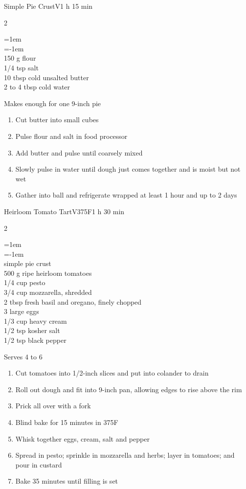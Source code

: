 \documentclass{article}
\newenvironment{recipe}[3][]
    {\begin{cardbase}[#1]{#2}{#3}
    \columnratio{0.333}
    \begin{paracol}{2}}
    {\end{paracol}\end{cardbase}}
\newenvironment{denserecipe}[3][]
    {\small
    \begin{recipe}[#1]{#2}{#3}}
    {\end{recipe}}
\newcommand{\nextcolumn}{\switchcolumn}
\newenvironment{ingredients}
    {
    \begin{obeylines}
    \vspace{\parskip}
    \setlength{\parskip}{0.25em}
    \vspace{-0.25em}
    \leftskip=1em
    \parindent=-1em}
    {\end{obeylines}}
\newenvironment{steps}
    {\begin{enumerate}[leftmargin=*,topsep=0pt]}
    {\end{enumerate}}
\newcommand{\fahrenheit}[1]{#1\textdegree{}F}
\newcommand{\tag}[1]{\hspace{1em}#1}
\newcommand{\symboltag}[2]{\tag{#1\hspace{0.4em}#2}}
\newcommand{\totaltime}[1]{\symboltag{\raisebox{-0.1em}{\small\StopWatchEnd}}{#1}}
\newcommand{\preheat}[1]{\symboltag{\Topbottomheat}{#1}}
\begin{document}
\begin{recipe}{Simple Pie Crust}{\tag{V}\totaltime{1 h 15 min}}
\begin{ingredients}
150 g flour
1/4 tsp salt
10 tbsp cold unsalted butter
2 to 4 tbsp cold water
\end{ingredients}
\nextcolumn
Makes enough for one 9-inch pie
\begin{steps}
    \item Cut butter into small cubes
    \item Pulse flour and salt in food processor
    \item Add butter and pulse until coarsely mixed
    \item Slowly pulse in water until dough just comes together and is moist but not wet
    \item Gather into ball and refrigerate wrapped at least 1 hour and up to 2 days
\end{steps}
\end{recipe}

\begin{denserecipe}{Heirloom Tomato Tart}{\tag{V}\preheat{\fahrenheit{375}}\totaltime{1 h 30 min}}
\begin{ingredients}
simple pie crust
500 g ripe heirloom tomatoes
1/4 cup pesto
3/4 cup mozzarella, shredded
2 tbsp fresh basil and oregano, finely chopped
3 large eggs
1/3 cup heavy cream
1/2 tsp kosher salt
1/2 tsp black pepper
\end{ingredients}
\nextcolumn
Serves 4 to 6
\begin{steps}
    \item Cut tomatoes into 1/2-inch slices and put into colander to drain
    \item Roll out dough and fit into 9-inch pan, allowing edges to rise above the rim
    \item Prick all over with a fork
    \item Blind bake for 15 minutes in \fahrenheit{375}
    \item Whisk together eggs, cream, salt and pepper
    \item Spread in pesto; sprinkle in mozzarella and herbs; layer in tomatoes; and pour in custard
    \item Bake 35 minutes until filling is set
\end{steps}
\end{denserecipe}
\end{document}
